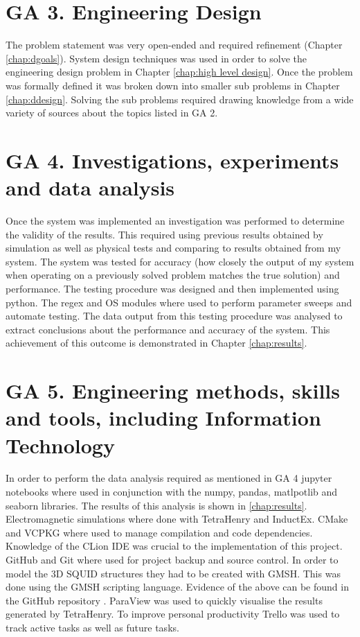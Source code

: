 \section{GA 3. Engineering Design}
The problem statement was very open-ended and required refinement (Chapter \ref{chap:dgoals}). System design techniques was used in order to solve the engineering design problem in Chapter \ref{chap:high level design}. Once the problem was formally defined it was broken down into smaller sub problems in Chapter \ref{chap:ddesign}. Solving the sub problems required drawing knowledge from a wide variety of sources about the topics listed in GA 2.
\section{GA 4. Investigations, experiments and data analysis}
Once the system was implemented an investigation was performed to determine the validity of the results. This required using previous results obtained by simulation as well as physical tests and comparing to results obtained from my system. The system was tested for accuracy (how closely the output of my system when operating on a previously solved problem matches the true solution) and performance. The testing procedure was designed and then implemented using python. The regex and OS modules where used to perform parameter sweeps and automate testing. The data output from this testing procedure was analysed to extract conclusions about the performance and accuracy of the system. This achievement of this outcome is demonstrated in Chapter \ref{chap:results}. 
\section{GA 5. Engineering methods, skills and tools, including Information Technology}
In order to perform the data analysis required as mentioned in GA 4 jupyter notebooks where used in conjunction with the numpy, pandas, matlpotlib and seaborn libraries. The results of this analysis is shown in \ref{chap:results}. Electromagnetic simulations where done with TetraHenry and InductEx. CMake and VCPKG where used to manage compilation and code dependencies. Knowledge of the CLion IDE was crucial to the implementation of this project. GitHub and Git where used for project backup and source control. In order to model the 3D SQUID structures they had to be created with GMSH. This was done using the GMSH scripting language. Evidence of the above can be found in the GitHub repository \cite{paulcode}. ParaView was used to quickly visualise the results generated by TetraHenry. To improve personal productivity Trello was used to track active tasks as well as future tasks.


